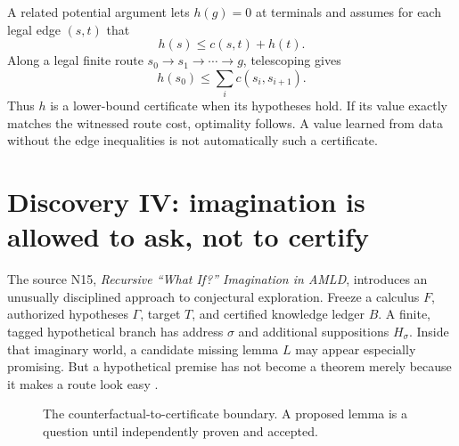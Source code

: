 \documentclass[11pt,letterpaper,oneside]{article}
\newcommand{\BANK}{\mathsf{BANK}}
\begin{document}
A related potential argument lets $h(g)=0$ at terminals and assumes for each legal edge $(s,t)$ that
\[
 h(s)\le c(s,t)+h(t).
\]
Along a legal finite route $s_0\to s_1\to\cdots\to g$, telescoping gives
\[
 h(s_0)\le \sum_{i}c(s_i,s_{i+1}).
\]
Thus $h$ is a lower-bound certificate when its hypotheses hold. If its value exactly matches the witnessed route cost, optimality follows. A value learned from data without the edge inequalities is not automatically such a certificate.

\section{Discovery IV: imagination is allowed to ask, not to certify}
The source N15, \emph{Recursive ``What If?'' Imagination in AMLD}, introduces an unusually disciplined approach to conjectural exploration. Freeze a calculus $F$, authorized hypotheses $\Gamma$, target $T$, and certified knowledge ledger $B$. A finite, tagged hypothetical branch has address $\sigma$ and additional suppositions $H_\sigma$. Inside that imaginary world, a candidate missing lemma $L$ may appear especially promising. But a hypothetical premise has not become a theorem merely because it makes a route look easy \cite{checkpoint}.

\begin{figure}[ht]
\centering
{}
\caption{The counterfactual-to-certificate boundary. A proposed lemma is a question until independently proven and accepted.}
\end{figure}
\end{document}

